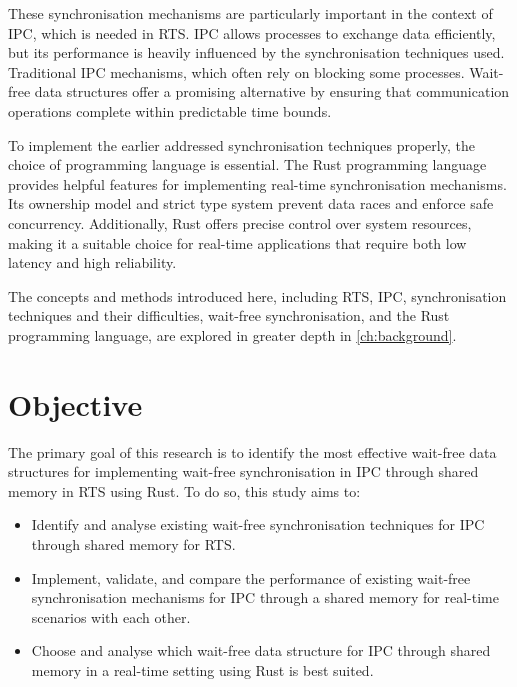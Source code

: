 These synchronisation mechanisms are particularly important in the context of \ac{IPC}, which is needed in \ac{RTS}. \ac{IPC} allows processes to exchange data efficiently, but its performance is heavily influenced by the synchronisation techniques used. Traditional \ac{IPC} mechanisms, which often rely on blocking some processes. Wait-free data structures offer a promising alternative by ensuring that communication operations complete within predictable time bounds. \cite{timnat2014practical, michael1996simple, huang2002improvingWaitFree, pellegrini2020relevancewaitfreecoordinationalgorithms}

To implement the earlier addressed synchronisation techniques properly, the choice of programming language is essential. The Rust programming language provides helpful features for implementing real-time synchronisation mechanisms. Its ownership model and strict type system prevent data races and enforce safe concurrency. Additionally, Rust offers precise control over system resources, making it a suitable choice for real-time applications that require both low latency and high reliability. \cite{xu2023rust, sharma2024rustembeddedsystemscurrent}

The concepts and methods introduced here, including \ac{RTS}, \ac{IPC}, synchronisation techniques and their difficulties, wait-free synchronisation, and the Rust programming language, are explored in greater depth in \cref{ch:background}. 

\section{Objective}\label{sec:objective}
The primary goal of this research is to identify the most effective wait-free data structures for implementing wait-free synchronisation in \ac{IPC} through shared memory in \ac{RTS} using Rust. To do so, this study aims to:

\begin{itemize}
\item Identify and analyse existing wait-free synchronisation techniques for \ac{IPC} through shared memory for \ac{RTS}.
\item Implement, validate, and compare the performance of existing wait-free synchronisation mechanisms for \ac{IPC} through a shared memory for real-time scenarios with each other.
\item Choose and analyse which wait-free data structure for \ac{IPC} through shared memory in a real-time setting using Rust is best suited.
\end{itemize}

